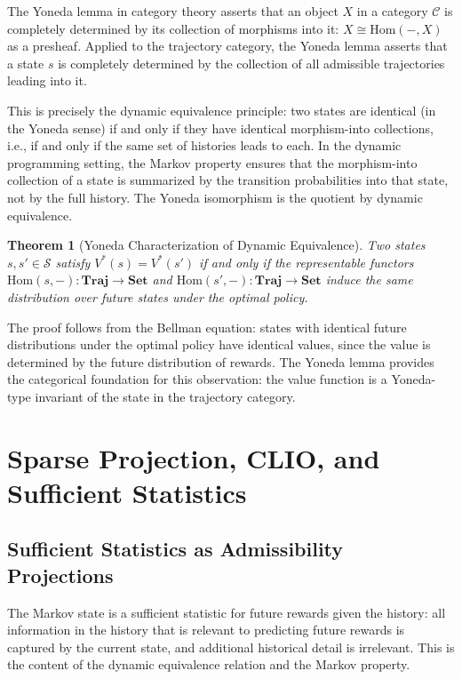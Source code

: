 \documentclass[12pt, a4paper, openany]{book}
\theoremstyle{plain}
\newtheorem{theorem}{Theorem}[chapter]
\theoremstyle{definition}
\theoremstyle{remark}
\begin{document}
The Yoneda lemma in category theory asserts that an object $X$ in a category $\mathcal{C}$ is completely determined by its collection of morphisms into it: $X \cong \mathrm{Hom}(-, X)$ as a presheaf. Applied to the trajectory category, the Yoneda lemma asserts that a state $s$ is completely determined by the collection of all admissible trajectories leading into it.

This is precisely the dynamic equivalence principle: two states are identical (in the Yoneda sense) if and only if they have identical morphism-into collections, i.e., if and only if the same set of histories leads to each. In the dynamic programming setting, the Markov property ensures that the morphism-into collection of a state is summarized by the transition probabilities into that state, not by the full history. The Yoneda isomorphism is the quotient by dynamic equivalence.

\begin{theorem}[Yoneda Characterization of Dynamic Equivalence]
Two states $s, s' \in \mathcal{S}$ satisfy $V^*(s) = V^*(s')$ if and only if the representable functors $\mathrm{Hom}(s, -): \mathbf{Traj} \to \mathbf{Set}$ and $\mathrm{Hom}(s', -): \mathbf{Traj} \to \mathbf{Set}$ induce the same distribution over future states under the optimal policy.
\end{theorem}

The proof follows from the Bellman equation: states with identical future distributions under the optimal policy have identical values, since the value is determined by the future distribution of rewards. The Yoneda lemma provides the categorical foundation for this observation: the value function is a Yoneda-type invariant of the state in the trajectory category.

\chapter{Sparse Projection, CLIO, and Sufficient Statistics}

\section{Sufficient Statistics as Admissibility Projections}

The Markov state is a sufficient statistic for future rewards given the history: all information in the history that is relevant to predicting future rewards is captured by the current state, and additional historical detail is irrelevant. This is the content of the dynamic equivalence relation and the Markov property.
\end{document}
